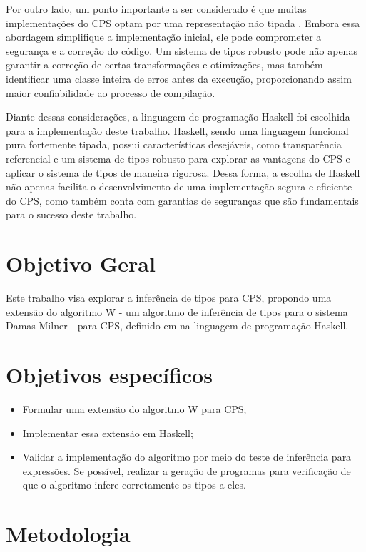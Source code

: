 Por outro lado, um ponto importante a ser considerado é que muitas implementações do CPS optam por uma representação não tipada \cite{MORRISSET1999}. Embora essa abordagem simplifique a implementação inicial, ele pode comprometer a segurança e a correção do código.
Um sistema de tipos robusto pode não apenas garantir a correção de certas transformações e otimizações, mas também identificar uma classe inteira de erros antes da execução, proporcionando assim maior confiabilidade ao processo de compilação.

Diante dessas considerações, a linguagem de programação Haskell foi escolhida para a implementação deste trabalho.
Haskell, sendo uma linguagem funcional pura fortemente tipada, possui características desejáveis, como transparência referencial \cite{SONDERGAARD1990} e um sistema de tipos robusto para explorar as vantagens do CPS e aplicar o sistema de tipos de maneira rigorosa.
Dessa forma, a escolha de Haskell não apenas facilita o desenvolvimento de uma implementação segura e eficiente do CPS, como também conta com garantias de seguranças que são fundamentais para o sucesso deste trabalho.

\section{Objetivo Geral}\label{sec:objetivo-geral}

Este trabalho visa explorar a inferência de tipos para CPS, propondo uma extensão do algoritmo W - um algoritmo de inferência de tipos para o sistema Damas-Milner - para CPS, definido em \cite{TORRENS2024} na linguagem de programação Haskell.

\section{Objetivos específicos}\label{sec:objetivos-especificos}

\begin{itemize}
  \item Formular uma extensão do algoritmo W para CPS;
  \item Implementar essa extensão em Haskell;
  \item Validar a implementação do algoritmo por meio do teste de inferência para expressões. Se possível, realizar a geração de programas para verificação de que o algoritmo infere corretamente os tipos a eles.
\end{itemize}

\section{Metodologia}\label{sec:metodologia}

